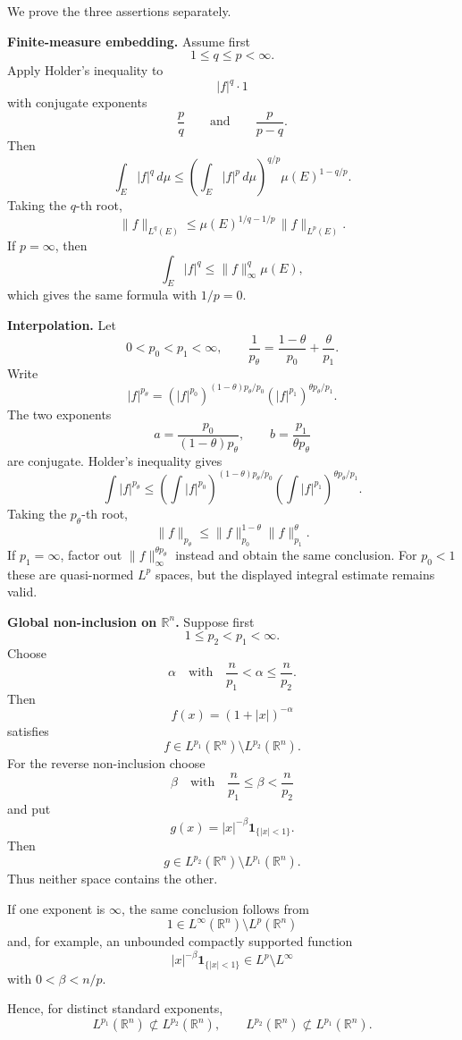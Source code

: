 \begin{solution}
We prove the three assertions separately.

\textbf{Finite-measure embedding.}
Assume first
\[
1\le q\le p<\infty.
\]
Apply Holder's inequality to
\[
|f|^q\cdot1
\]
with conjugate exponents
\[
\frac pq
\qquad\text{and}\qquad
\frac{p}{p-q}.
\]
Then
\[
\int_E|f|^q\,d\mu
\le
\left(\int_E|f|^p\,d\mu\right)^{q/p}
\mu(E)^{1-q/p}.
\]
Taking the \(q\)-th root,
\[
\boxed{
\|f\|_{L^q(E)}
\le
\mu(E)^{1/q-1/p}\,
\|f\|_{L^p(E)}.
}
\]
If \(p=\infty\), then
\[
\int_E|f|^q
\le
\|f\|_\infty^q\mu(E),
\]
which gives the same formula with \(1/p=0\).

\textbf{Interpolation.}
Let
\[
0<p_0<p_1<\infty,
\qquad
\frac1{p_\theta}
=
\frac{1-\theta}{p_0}
+
\frac{\theta}{p_1}.
\]
Write
\[
|f|^{p_\theta}
=
\left(|f|^{p_0}\right)^{(1-\theta)p_\theta/p_0}
\left(|f|^{p_1}\right)^{\theta p_\theta/p_1}.
\]
The two exponents
\[
a=\frac{p_0}{(1-\theta)p_\theta},
\qquad
b=\frac{p_1}{\theta p_\theta}
\]
are conjugate. Holder's inequality gives
\[
\int|f|^{p_\theta}
\le
\left(\int|f|^{p_0}\right)^{(1-\theta)p_\theta/p_0}
\left(\int|f|^{p_1}\right)^{\theta p_\theta/p_1}.
\]
Taking the \(p_\theta\)-th root,
\[
\boxed{
\|f\|_{p_\theta}
\le
\|f\|_{p_0}^{1-\theta}
\|f\|_{p_1}^{\theta}.
}
\]
If \(p_1=\infty\), factor out
\(\|f\|_\infty^{\theta p_\theta}\) instead and obtain the same conclusion.
For \(p_0<1\) these are quasi-normed \(L^p\) spaces, but the displayed integral estimate
remains valid.

\textbf{Global non-inclusion on \(\mathbb R^n\).}
Suppose first
\[
1\le p_2<p_1<\infty.
\]
Choose
\[
\alpha
\quad\text{with}\quad
\frac{n}{p_1}<\alpha\le\frac{n}{p_2}.
\]
Then
\[
f(x)=(1+|x|)^{-\alpha}
\]
satisfies
\[
f\in L^{p_1}(\mathbb R^n)
\setminus L^{p_2}(\mathbb R^n).
\]
For the reverse non-inclusion choose
\[
\beta
\quad\text{with}\quad
\frac{n}{p_1}\le\beta<\frac{n}{p_2}
\]
and put
\[
g(x)
=
|x|^{-\beta}\mathbf1_{\{|x|<1\}}.
\]
Then
\[
g\in L^{p_2}(\mathbb R^n)
\setminus L^{p_1}(\mathbb R^n).
\]
Thus neither space contains the other.

If one exponent is \(\infty\), the same conclusion follows from
\[
1\in L^\infty(\mathbb R^n)\setminus L^p(\mathbb R^n)
\]
and, for example, an unbounded compactly supported function
\[
|x|^{-\beta}\mathbf1_{\{|x|<1\}}
\in L^p\setminus L^\infty
\]
with \(0<\beta<n/p\).

Hence, for distinct standard exponents,
\[
\boxed{
L^{p_1}(\mathbb R^n)
\not\subset
L^{p_2}(\mathbb R^n),
\qquad
L^{p_2}(\mathbb R^n)
\not\subset
L^{p_1}(\mathbb R^n).
}
\]


\end{solution}
